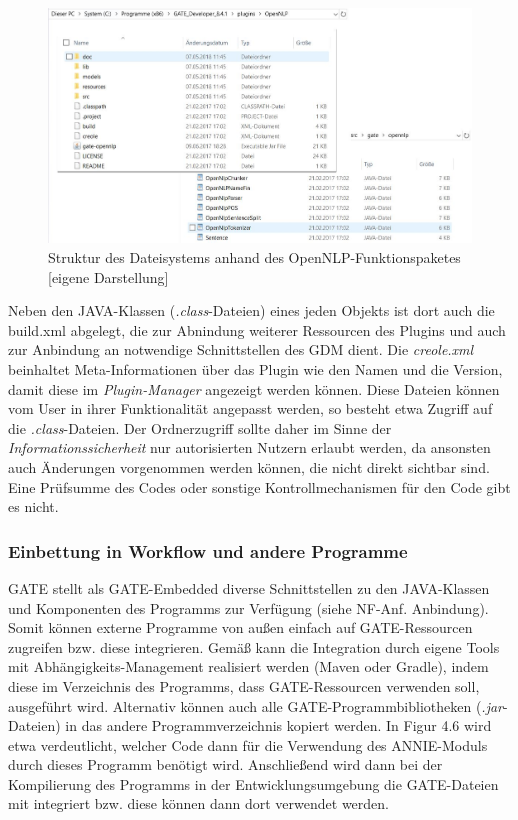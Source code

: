\documentclass[12pt]{report}
\begin{document}
\begin{figure}[h!]
\begin{center}
\includegraphics[scale=0.55]{GATE_Bilder/PluginOrdner.jpg}
\caption{Struktur des Dateisystems anhand des OpenNLP-Funktionspaketes [eigene Darstellung]}
\end{center}
\end{figure} 

Neben den JAVA-Klassen (\textit{.class}-Dateien) eines jeden Objekts ist dort auch die build.xml abgelegt, die zur Abnindung weiterer Ressourcen des Plugins und auch zur Anbindung an notwendige Schnittstellen des GDM dient. Die \textit{creole.xml} beinhaltet Meta-Informationen über das Plugin wie den Namen und die Version, damit diese im \textit{Plugin-Manager} angezeigt werden können. Diese Dateien können vom User in ihrer Funktionalität angepasst werden, so besteht etwa Zugriff auf die \textit{.class}-Dateien. Der Ordnerzugriff sollte daher im Sinne der \textit{Informationssicherheit} nur autorisierten Nutzern erlaubt werden, da ansonsten auch Änderungen vorgenommen werden können, die nicht direkt sichtbar sind. Eine Prüfsumme des Codes oder sonstige Kontrollmechanismen für den Code gibt es nicht.\\

\subsubsection{Einbettung in Workflow und andere Programme}
GATE stellt als GATE-Embedded diverse Schnittstellen zu den JAVA-Klassen und Komponenten des Programms zur Verfügung (siehe NF-Anf. \glqq  Anbindung\grqq{}). Somit können externe Programme von außen einfach auf GATE-Ressourcen zugreifen bzw. diese integrieren. Gemäß \cite{gt18} kann die Integration durch eigene Tools mit Abhängigkeits-Management realisiert werden (Maven oder Gradle), indem diese im Verzeichnis des Programms, dass GATE-Ressourcen verwenden soll, ausgeführt wird. Alternativ können auch alle GATE-Programmbibliotheken (\textit{.jar}-Dateien) in das andere Programmverzeichnis kopiert werden. In Figur 4.6 wird etwa verdeutlicht, welcher Code dann für die Verwendung des ANNIE-Moduls durch dieses Programm benötigt wird. Anschließend wird dann bei der Kompilierung des Programms in der Entwicklungsumgebung die GATE-Dateien mit integriert bzw. diese können dann dort verwendet werden. 
 
\end{document}

